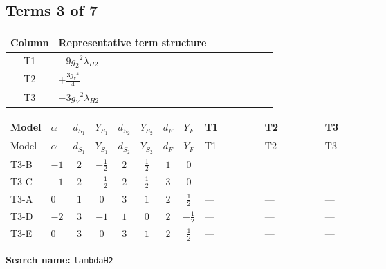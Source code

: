 \documentclass[8pt]{article}
\begin{document}
\begin{landscape}
\subsection*{Terms 3 of 7}
\begin{center}
\begin{tabular}{@{}c >{\raggedright\arraybackslash}p{0.82\linewidth}@{}}
\toprule
Column & Representative term structure \\
\midrule
T1 & \(\displaystyle -9 {g_2}^2 {\lambda_{H2}}\) \\
\midrule
T2 & \(\displaystyle +\frac{3 {g_Y}^4}{4}\) \\
\midrule
T3 & \(\displaystyle -3 {g_Y}^2 {\lambda_{H2}}\) \\
\midrule
\bottomrule
\end{tabular}
\end{center}
\smallskip
\tiny
\begin{longtable}{@{}llcccccc >{\raggedright\arraybackslash}p{0.21\linewidth} >{\raggedright\arraybackslash}p{0.21\linewidth} >{\raggedright\arraybackslash}p{0.21\linewidth}@{}}
\toprule
Model & $\alpha$ & $d_{S_1}$ & $Y_{S_1}$ & $d_{S_2}$ & $Y_{S_2}$ & $d_F$ & $Y_F$ & T1 & T2 & T3 \\
\midrule
\endfirsthead
\toprule
Model & $\alpha$ & $d_{S_1}$ & $Y_{S_1}$ & $d_{S_2}$ & $Y_{S_2}$ & $d_F$ & $Y_F$ & T1 & T2 & T3 \\
\midrule
\endhead
T3-B & $-1$ & $2$ & $-\frac{1}{2}$ & $2$ & $\frac{1}{2}$ & $1$ & $0$ & \scriptsize\adjustbox{max width=\linewidth}{$\begin{gathered} -9 {g_2}^2 {\lambda_{H2}}\end{gathered}$} & \scriptsize\adjustbox{max width=\linewidth}{$\begin{gathered} +\frac{3 {g_Y}^4}{4}\end{gathered}$} & \scriptsize\adjustbox{max width=\linewidth}{$\begin{gathered} -3 {g_Y}^2 {\lambda_{H2}}\end{gathered}$} \\
\midrule
T3-C & $-1$ & $2$ & $-\frac{1}{2}$ & $2$ & $\frac{1}{2}$ & $3$ & $0$ & \scriptsize\adjustbox{max width=\linewidth}{$\begin{gathered} -9 {g_2}^2 {\lambda_{H2}}\end{gathered}$} & \scriptsize\adjustbox{max width=\linewidth}{$\begin{gathered} +\frac{3 {g_Y}^4}{4}\end{gathered}$} & \scriptsize\adjustbox{max width=\linewidth}{$\begin{gathered} -3 {g_Y}^2 {\lambda_{H2}}\end{gathered}$} \\
\midrule
T3-A & $0$ & $1$ & $0$ & $3$ & $1$ & $2$ & $\frac{1}{2}$ & --- & --- & --- \\
\midrule
T3-D & $-2$ & $3$ & $-1$ & $1$ & $0$ & $2$ & $-\frac{1}{2}$ & --- & --- & --- \\
\midrule
T3-E & $0$ & $3$ & $0$ & $3$ & $1$ & $2$ & $\frac{1}{2}$ & --- & --- & --- \\
\midrule
\bottomrule
\end{longtable}
\clearpage
\noindent\textbf{Search name: }\texttt{lambdaH2}\par\smallskip

\end{landscape}
\end{document}
